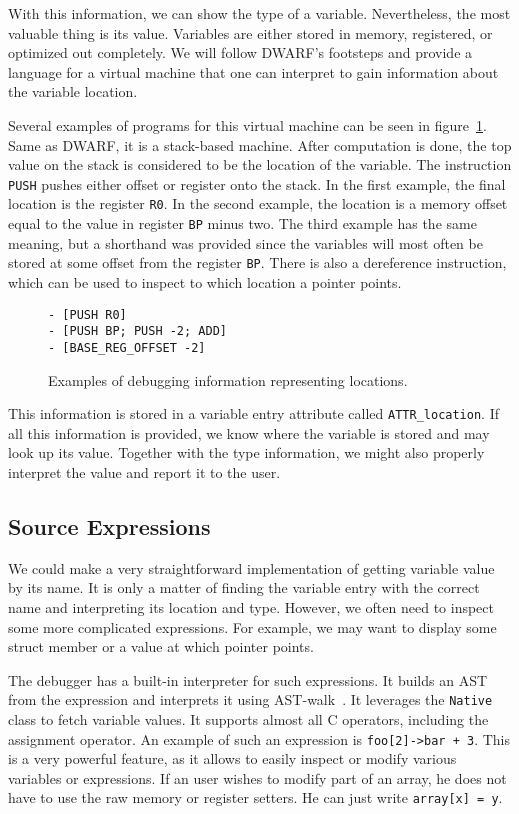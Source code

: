 With this information, we can show the type of a variable. Nevertheless, the
most valuable thing is its value. Variables are either stored in memory,
registered, or optimized out completely. We will follow DWARF's footsteps and
provide a language for a virtual machine that one can interpret to gain
information about the variable location.

Several examples of programs for this virtual machine can be seen in
figure~\ref{fig:t86dbg-vm}. Same as DWARF, it is a stack-based machine. After
computation is done, the top value on the stack is considered to be the
location of the variable. The instruction \texttt{PUSH} pushes either offset or
register onto the stack. In the first example, the final location is the
register \texttt{R0}. In the second example, the location is a memory offset
equal to the value in register \texttt{BP} minus two. The third example has the
same meaning, but a shorthand was provided since the variables will most often
be stored at some offset from the register \texttt{BP}. There is also a
dereference instruction, which can be used to inspect to which location a
pointer points.

\begin{figure}
    \begin{lstlisting}
- [PUSH R0]
- [PUSH BP; PUSH -2; ADD]
- [BASE_REG_OFFSET -2]
    \end{lstlisting}
    \caption{Examples of debugging information representing locations.}
    \label{fig:t86dbg-vm}
\end{figure}

This information is stored in a variable entry attribute called
\texttt{ATTR\_location}. If all this information is provided, we know where the
variable is stored and may look up its value. Together with the type
information, we might also properly interpret the value and report it to the
user.

\subsection{Source Expressions}
We could make a very straightforward implementation of getting variable value
by its name. It is only a matter of finding the variable entry with the correct
name and interpreting its location and type. However, we often need to inspect
some more complicated expressions. For example, we may want to display some
struct member or a value at which pointer points.

The debugger has a built-in interpreter for such expressions. It builds an AST
from the expression and interprets it using
AST-walk~\cite{crafting-interpreters}. It leverages the \texttt{Native} class
to fetch variable values. It supports almost all C operators, including the
assignment operator. An example of such an expression is \texttt{foo[2]->bar + 3}.
This is a very powerful feature, as it allows to easily inspect or modify
various variables or expressions. If an user wishes to modify part of an
array, he does not have to use the raw memory or register setters. He can
just write \texttt{array[x] = y}.

